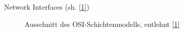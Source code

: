 \documentclass[ngerman,aspectratio=169]{beamer}
\begin{document}
\begin{frame}{Network Interfaces (sh. \hyperlink{ref:rene}{[1]})}
{\begin{multicols}{2}
\begin{figure}
					\caption{Ausschnitt des OSI-Schichtenmodells, entlehnt \hyperlink{ref:rene}{[1]}}
				\end{figure}
			\end{multicols}
		}
	\end{frame}
\end{document}

